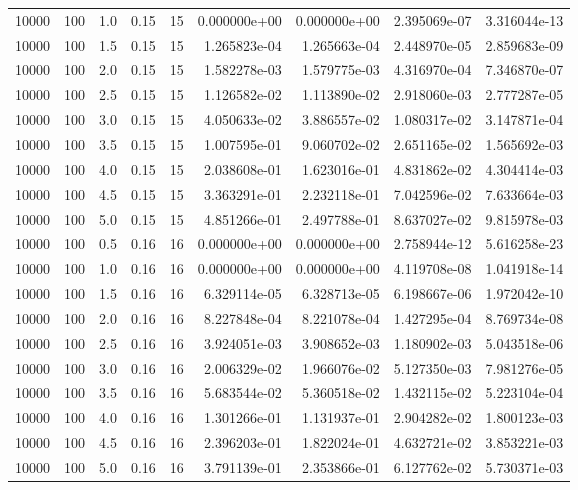 \begin{tabular}{rrrrrrrrr}
 10000 &  100 &  1.0 &  0.15 &    15 &  0.000000e+00 &  0.000000e+00 &  2.395069e-07 &  3.316044e-13 \\
 10000 &  100 &  1.5 &  0.15 &    15 &  1.265823e-04 &  1.265663e-04 &  2.448970e-05 &  2.859683e-09 \\
 10000 &  100 &  2.0 &  0.15 &    15 &  1.582278e-03 &  1.579775e-03 &  4.316970e-04 &  7.346870e-07 \\
 10000 &  100 &  2.5 &  0.15 &    15 &  1.126582e-02 &  1.113890e-02 &  2.918060e-03 &  2.777287e-05 \\
 10000 &  100 &  3.0 &  0.15 &    15 &  4.050633e-02 &  3.886557e-02 &  1.080317e-02 &  3.147871e-04 \\
 10000 &  100 &  3.5 &  0.15 &    15 &  1.007595e-01 &  9.060702e-02 &  2.651165e-02 &  1.565692e-03 \\
 10000 &  100 &  4.0 &  0.15 &    15 &  2.038608e-01 &  1.623016e-01 &  4.831862e-02 &  4.304414e-03 \\
 10000 &  100 &  4.5 &  0.15 &    15 &  3.363291e-01 &  2.232118e-01 &  7.042596e-02 &  7.633664e-03 \\
 10000 &  100 &  5.0 &  0.15 &    15 &  4.851266e-01 &  2.497788e-01 &  8.637027e-02 &  9.815978e-03 \\
 10000 &  100 &  0.5 &  0.16 &    16 &  0.000000e+00 &  0.000000e+00 &  2.758944e-12 &  5.616258e-23 \\
 10000 &  100 &  1.0 &  0.16 &    16 &  0.000000e+00 &  0.000000e+00 &  4.119708e-08 &  1.041918e-14 \\
 10000 &  100 &  1.5 &  0.16 &    16 &  6.329114e-05 &  6.328713e-05 &  6.198667e-06 &  1.972042e-10 \\
 10000 &  100 &  2.0 &  0.16 &    16 &  8.227848e-04 &  8.221078e-04 &  1.427295e-04 &  8.769734e-08 \\
 10000 &  100 &  2.5 &  0.16 &    16 &  3.924051e-03 &  3.908652e-03 &  1.180902e-03 &  5.043518e-06 \\
 10000 &  100 &  3.0 &  0.16 &    16 &  2.006329e-02 &  1.966076e-02 &  5.127350e-03 &  7.981276e-05 \\
 10000 &  100 &  3.5 &  0.16 &    16 &  5.683544e-02 &  5.360518e-02 &  1.432115e-02 &  5.223104e-04 \\
 10000 &  100 &  4.0 &  0.16 &    16 &  1.301266e-01 &  1.131937e-01 &  2.904282e-02 &  1.800123e-03 \\
 10000 &  100 &  4.5 &  0.16 &    16 &  2.396203e-01 &  1.822024e-01 &  4.632721e-02 &  3.853221e-03 \\
 10000 &  100 &  5.0 &  0.16 &    16 &  3.791139e-01 &  2.353866e-01 &  6.127762e-02 &  5.730371e-03 \\

\end{tabular}
